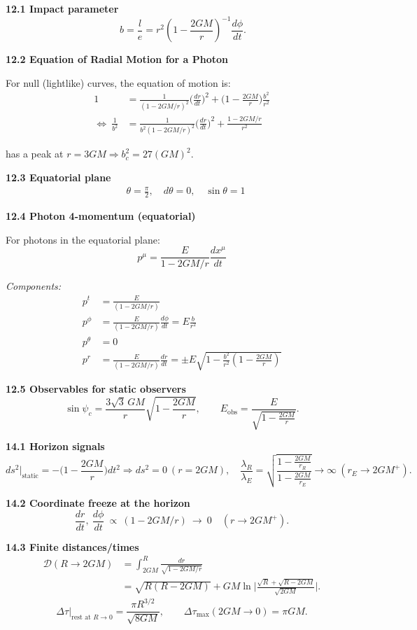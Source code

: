 \documentclass[10pt]{article}
\newcommand{\chead}[1]{\vspace{6pt}{\large \textbf{#1}}\par}
\begin{document}
\begin{multicols*}{2}
\textbf{12.1 Impact parameter}
\[
\boxed{\ b=\frac{l}{e}=
r^2\left(1-\frac{2 G M}{r}\right)^{-1} \frac{d \phi}{d t} }.
\]

\textbf{12.2 Equation of Radial Motion for a Photon}

For null (lightlike) curves, the equation of motion is:
\[
\begin{aligned}
1&=\frac{1}{(1-2GM/r)^2}\Big(\frac{dr}{dt}\Big)^2+\Big(1-\frac{2GM}{r}\Big)\frac{b^2}{r^2}\\
 \Longleftrightarrow\  \frac{1}{b^2}&=\frac{1}{b^2(1-2GM/r)^2}\Big(\frac{dr}{dt}\Big)^2+\frac{1-2GM/r}{r^2}
\end{aligned}
\]

has a peak at $r=3GM\Rightarrow b_c^2=27(GM)^2$.

\textbf{12.3 Equatorial plane}
$$
\begin{aligned}
&\theta=\frac{\pi}{2}, \quad d \theta=0, \quad \sin \theta=1
\end{aligned}
$$

\textbf{12.4 Photon 4-momentum (equatorial)}

For photons in the equatorial plane:
$$
p^\mu=\frac{E}{1-2 G M / r} \frac{d x^\mu}{d t}
$$

\textit{Components:}
$$
\begin{aligned}
p^t&=\frac{E}{(1-2 G M / r)}\\
p^\phi &=\frac{E}{(1-2 G M / r)} \frac{d \phi}{d t}=E \frac{b}{r^2} \\
p^\theta &=0\\
p^r&=\frac{E}{(1-2 G M / r)} \frac{d r}{d t}= \pm E \sqrt{1-\frac{b^2}{r^2}\left(1-\frac{2 G M}{r}\right)}
\end{aligned}
$$

\textbf{12.5 Observables for static observers}
\[
\sin\psi_c=\frac{3\sqrt{3}\,GM}{r}\sqrt{1-\frac{2GM}{r}},\qquad
E_{\text{obs}}=\frac{E}{\sqrt{1-\tfrac{2GM}{r}}}.
\]

\chead{Ch 14. Event Horizon}

\textbf{14.1 Horizon signals}
\[
ds^2\Big|_{\text{static}}= -\Big(1-\frac{2GM}{r}\Big)dt^2\Rightarrow ds^2=0\ (r=2GM),\quad
\frac{\lambda_R}{\lambda_E}=\sqrt{\frac{1-\tfrac{2GM}{r_R}}{1-\tfrac{2GM}{r_E}}}\to\infty\ (r_E\to2GM^+).
\]

\textbf{14.2 Coordinate freeze at the horizon}
\[
\frac{dr}{dt},\ \frac{d\phi}{dt}\ \propto\ (1-2GM/r)\ \to\ 0\quad (r\to2GM^+).
\]

\textbf{14.3 Finite distances/times}
\[
\begin{aligned}
\mathcal D( R\to 2GM)&=\int_{2GM}^{R}\!\frac{dr}{\sqrt{1-2GM/r}}\\[2pt]
&=\sqrt{R(R-2GM)}+GM\ln\!\Bigg|\frac{\sqrt{R}+\sqrt{R-2GM}}{\sqrt{2GM}}\Bigg|.
\end{aligned}
\]
\[
\Delta\tau\Big|_{\text{rest at }R\to0}=\frac{\pi R^{3/2}}{\sqrt{8GM}},\qquad \Delta\tau_{\max}(2GM\to0)=\pi GM.
\]

\end{multicols*}
\end{document}

